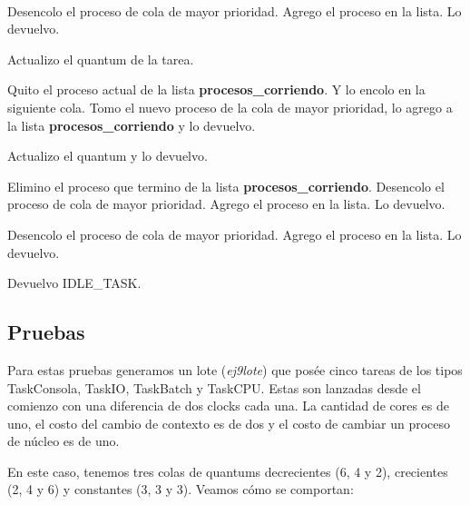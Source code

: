 ~

\begin{algorithmic}

		\State Desencolo el proceso de cola de mayor prioridad.
		\State Agrego el proceso en la lista.
		\State Lo devuelvo.
		
	
		\State Actualizo el quantum de la tarea.

			\State Quito el proceso actual de la lista \textbf{procesos\_corriendo}. Y lo encolo en la siguiente cola.
			\State Tomo el nuevo proceso de la cola de mayor prioridad, lo agrego a la lista \textbf{procesos\_corriendo} y lo devuelvo.

			\State Actualizo el quantum y lo devuelvo.

		\EndIf

		\State Elimino el proceso que termino de la lista \textbf{procesos\_corriendo}.
		\State Desencolo el proceso de cola de mayor prioridad.
		\State Agrego el proceso en la lista.
		\State Lo devuelvo.

		\State Desencolo el proceso de cola de mayor prioridad.
		\State Agrego el proceso en la lista.
		\State Lo devuelvo.
	
	\Else
		\State Devuelvo IDLE\_TASK.

	\EndIf
\EndFunction	
\end{algorithmic}

\subsection{Pruebas}

Para estas pruebas generamos un lote (\textit{ej9lote}) que posée cinco tareas de los tipos TaskConsola, TaskIO, TaskBatch y TaskCPU. Estas son lanzadas desde el comienzo con una diferencia de dos clocks cada una. La cantidad de cores es de uno, el costo del cambio de contexto es de dos y el costo de cambiar un proceso de núcleo es de uno.

En este caso, tenemos tres colas de quantums decrecientes (6, 4 y 2), crecientes (2, 4 y 6) y constantes (3, 3 y 3). Veamos cómo se comportan:

